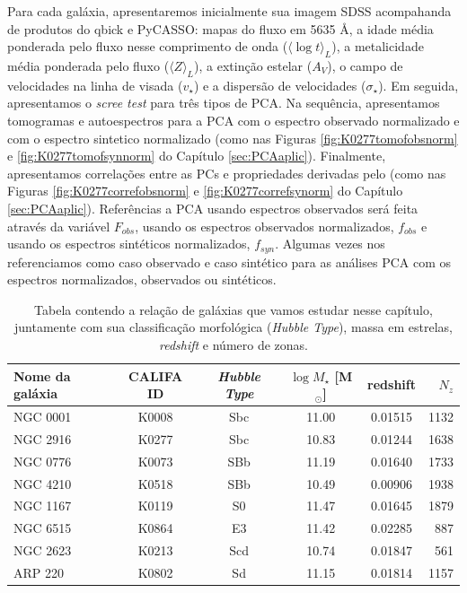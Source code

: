 Para cada galáxia, apresentaremos inicialmente sua imagem SDSS acompahanda de produtos do {\sc qbick} e PyCASSO: mapas
do fluxo em 5635 \AA, a idade média ponderada pelo fluxo nesse comprimento de onda ($\langle \log t \rangle_L$), a
metalicidade média ponderada pelo fluxo ($\langle Z \rangle_L$), a extinção estelar ($A_V$), o campo de velocidades na
linha de visada ($v_\star$) e a dispersão de velocidades ($\sigma_\star$). Em seguida, apresentamos o {\em scree test}
para três tipos de PCA. Na sequência, apresentamos tomogramas e autoespectros para a PCA com o espectro observado
normalizado e com o espectro sintetico normalizado (como nas Figuras \ref{fig:K0277tomofobsnorm} e
\ref{fig:K0277tomofsynnorm} do Capítulo \ref{sec:PCAaplic}). Finalmente, apresentamos correlações entre as PCs e
propriedades derivadas pelo \starlight (como nas Figuras \ref{fig:K0277correfobsnorm} e \ref{fig:K0277correfsynorm} do
Capítulo \ref{sec:PCAaplic}). Referências a PCA usando espectros observados será feita através da variável $F_{obs}$,
usando os espectros observados normalizados, $f_{obs}$ e usando os espectros sintéticos normalizados, $f_{syn}$. Algumas
vezes nos referenciamos como caso observado e caso sintético para as análises PCA com os espectros normalizados,
observados ou sintéticos.

\begin{table}
	\caption[Relação de galáxias do CALIFA usadas neste trabalho.]
	{Tabela contendo a relação de galáxias que vamos estudar nesse capítulo, juntamente com sua classificação morfológica
	({\em Hubble Type}), massa em estrelas, {\em redshift} e número de zonas.}
	\begin{tabular}{l c c c c r}
		Nome da galáxia & CALIFA ID & {\em Hubble Type} & $\log M_\star$ [M$_\odot$] & redshift & $N_z$ \\
		\midrule
		NGC 0001 & K0008 & Sbc & 11.00 & 0.01515 & 1132 \\
		NGC 2916 & K0277 & Sbc & 10.83 & 0.01244 & 1638 \\
		NGC 0776 & K0073 & SBb  & 11.19 & 0.01640 & 1733 \\
		NGC 4210 & K0518 & SBb  & 10.49 & 0.00906 & 1938 \\
		NGC 1167 & K0119 & S0  & 11.47 & 0.01645 & 1879 \\
		NGC 6515 & K0864 & E3  & 11.42 & 0.02285 & 887  \\
		NGC 2623 & K0213 & Scd & 10.74 & 0.01847 & 561  \\
		ARP 220  & K0802 & Sd  & 11.15 & 0.01814 & 1157 \\
	\end{tabular}
	\label{tab:amostraGalaxias}
\end{table}

